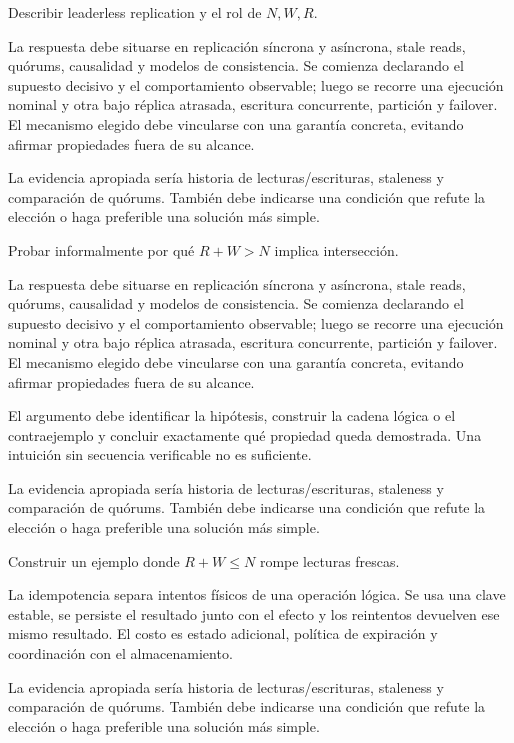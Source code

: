 \documentclass[variant=guia,cover=institutional,mode=screen]{ua-engineering-v6-article}
\begin{document}
\begin{uaexercise}
Describir leaderless replication y el rol de $N,W,R$.
\end{uaexercise}
\begin{uaanswer}
La respuesta debe situarse en replicación síncrona y asíncrona, stale reads, quórums, causalidad y modelos de consistencia. Se comienza declarando el supuesto decisivo y el comportamiento observable; luego se recorre una ejecución nominal y otra bajo réplica atrasada, escritura concurrente, partición y failover. El mecanismo elegido debe vincularse con una garantía concreta, evitando afirmar propiedades fuera de su alcance.

La evidencia apropiada sería historia de lecturas/escrituras, staleness y comparación de quórums. También debe indicarse una condición que refute la elección o haga preferible una solución más simple.
\end{uaanswer}

\begin{uaexercise}
Probar informalmente por qué $R+W>N$ implica intersección.
\end{uaexercise}
\begin{uaanswer}
La respuesta debe situarse en replicación síncrona y asíncrona, stale reads, quórums, causalidad y modelos de consistencia. Se comienza declarando el supuesto decisivo y el comportamiento observable; luego se recorre una ejecución nominal y otra bajo réplica atrasada, escritura concurrente, partición y failover. El mecanismo elegido debe vincularse con una garantía concreta, evitando afirmar propiedades fuera de su alcance.

El argumento debe identificar la hipótesis, construir la cadena lógica o el contraejemplo y concluir exactamente qué propiedad queda demostrada. Una intuición sin secuencia verificable no es suficiente.

La evidencia apropiada sería historia de lecturas/escrituras, staleness y comparación de quórums. También debe indicarse una condición que refute la elección o haga preferible una solución más simple.
\end{uaanswer}

\begin{uaexercise}
Construir un ejemplo donde $R+W\le N$ rompe lecturas frescas.
\end{uaexercise}
\begin{uaanswer}
La idempotencia separa intentos físicos de una operación lógica. Se usa una clave estable, se persiste el resultado junto con el efecto y los reintentos devuelven ese mismo resultado. El costo es estado adicional, política de expiración y coordinación con el almacenamiento.

La evidencia apropiada sería historia de lecturas/escrituras, staleness y comparación de quórums. También debe indicarse una condición que refute la elección o haga preferible una solución más simple.
\end{uaanswer}
\end{document}
